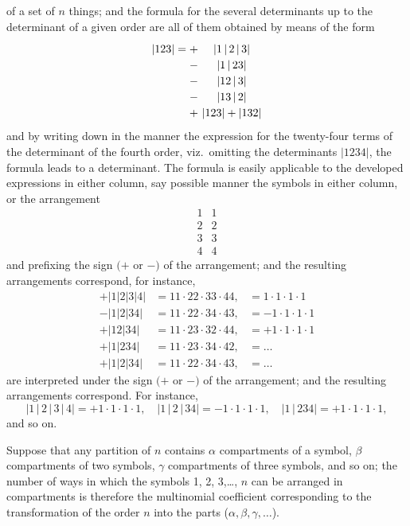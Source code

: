 \documentclass[11pt,a4paper]{article}
\begin{document}
\noindent of a set of $n$ things; and the formula for the several determinants up to the determinant of a given order are all of them obtained by means of the form
\[
\renewcommand{\arraystretch}{1.2}
\begin{array}{r@{}c@{}l}
|123|=+\ & |1\,|\,2\,|\,3| & \\
-\ & |1\,|\,23| & \\
-\ & |12\,|\,3| & \\
-\ & |13\,|\,2| & \\
+\ & |123|+|132| &
\end{array}
\]
and by writing down in the manner the expression for the twenty-four terms of the determinant of the fourth order, viz.\ omitting the determinants $|1234|$, the formula leads to a determinant. The formula is easily applicable to the developed expressions in either column, say possible manner the symbols in either column, or the arrangement
\[
\begin{array}{cccc}
1 & 1 \\
2 & 2 \\
3 & 3 \\
4 & 4
\end{array}
\]
and prefixing the sign $(+$ or $-)$ of the arrangement; and the resulting arrangements correspond, for instance,
\[
\begin{array}{c|c|c}
+|1|2|3|4| & =11\cdot 22\cdot 33\cdot 44, & =1\cdot 1\cdot 1\cdot 1 \\
-|1|2|34| & =11\cdot 22\cdot 34\cdot 43, & =-1\cdot 1\cdot 1\cdot 1 \\
+|12|34| & =11\cdot 23\cdot 32\cdot 44, & =+1\cdot 1\cdot 1\cdot 1 \\
+|1|234| & =11\cdot 23\cdot 34\cdot 42, & = \ldots \\
+|1|2|34| & =11\cdot 22\cdot 34\cdot 43, & = \ldots
\end{array}
\]
are interpreted under the sign $(+$ or $-)$ of the arrangement; and the resulting arrangements correspond. For instance,
\[
|1\,|\,2\,|\,3\,|\,4| =+1\cdot 1\cdot 1\cdot 1, \quad |1\,|\,2\,|\,34|=-1\cdot 1\cdot 1\cdot 1, \quad |1\,|\,234|=+1\cdot 1\cdot 1\cdot 1,
\]
and so on.

\medskip

Suppose that any partition of $n$ contains $\alpha$ compartments of a symbol, $\beta$ compartments of two symbols, $\gamma$ compartments of three symbols, and so on; the number of ways in which the symbols 1, 2, 3,\ldots, $n$ can be arranged in compartments is therefore the multinomial coefficient corresponding to the transformation of the order $n$ into the parts ($\alpha,\beta,\gamma,\ldots$).
\end{document}
